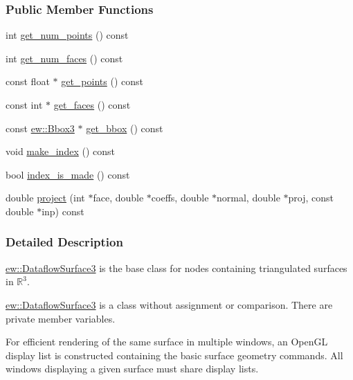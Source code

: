 \subsubsection*{Public Member Functions}
\begin{DoxyCompactItemize}
\item 
int \hyperlink{classew_1_1DataflowSurface3_aab3c901dd150f4710c74c1cb1d140148}{get\_\-num\_\-points} () const 
\item 
int \hyperlink{classew_1_1DataflowSurface3_a2c3f79bba2d55ccfbe69d835af41d29e}{get\_\-num\_\-faces} () const 
\item 
const float $\ast$ \hyperlink{classew_1_1DataflowSurface3_aa585fbba3006c5a3a2c632cadd3f3cb7}{get\_\-points} () const 
\item 
const int $\ast$ \hyperlink{classew_1_1DataflowSurface3_abd809f7c907735fd027f6eb1f1f02be8}{get\_\-faces} () const 
\item 
const \hyperlink{classew_1_1Bbox3}{ew::Bbox3} $\ast$ \hyperlink{classew_1_1DataflowSurface3_aa68f8500425fc37c39bdf32e4b8c7ed1}{get\_\-bbox} () const 
\item 
void \hyperlink{classew_1_1DataflowSurface3_a42bc13a486803818b1db79cebac458d6}{make\_\-index} () const 
\item 
bool \hyperlink{classew_1_1DataflowSurface3_a81598b76d3bec4581fed07ac1858ca91}{index\_\-is\_\-made} () const 
\item 
double \hyperlink{classew_1_1DataflowSurface3_afd02a18df829a9608dac90940f603d83}{project} (int $\ast$face, double $\ast$coeffs, double $\ast$normal, double $\ast$proj, const double $\ast$inp) const 
\end{DoxyCompactItemize}


\subsubsection{Detailed Description}
\hyperlink{classew_1_1DataflowSurface3}{ew::DataflowSurface3} is the base class for nodes containing triangulated surfaces in $\mathbb{R}^3$.

\hyperlink{classew_1_1DataflowSurface3}{ew::DataflowSurface3} is a class without assignment or comparison. There are private member variables.

For efficient rendering of the same surface in multiple windows, an OpenGL display list is constructed containing the basic surface geometry commands. All windows displaying a given surface must share display lists. 


